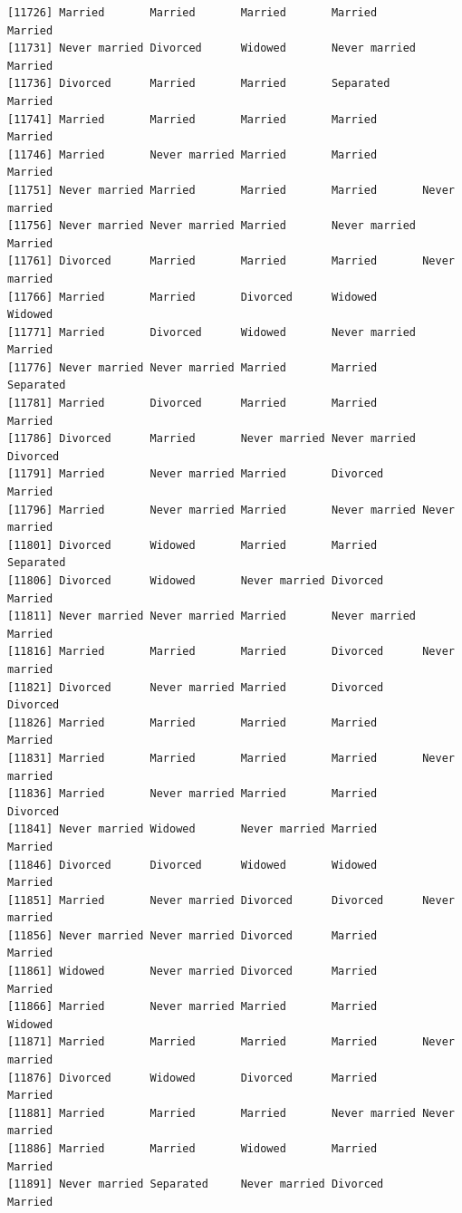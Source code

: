 \documentclass[
  letterpaper,
  DIV=11,
  numbers=noendperiod,
  oneside]{scrartcl}
\begin{document}
\begin{verbatim}
[11726] Married       Married       Married       Married       Married      
[11731] Never married Divorced      Widowed       Never married Married      
[11736] Divorced      Married       Married       Separated     Married      
[11741] Married       Married       Married       Married       Married      
[11746] Married       Never married Married       Married       Married      
[11751] Never married Married       Married       Married       Never married
[11756] Never married Never married Married       Never married Married      
[11761] Divorced      Married       Married       Married       Never married
[11766] Married       Married       Divorced      Widowed       Widowed      
[11771] Married       Divorced      Widowed       Never married Married      
[11776] Never married Never married Married       Married       Separated    
[11781] Married       Divorced      Married       Married       Married      
[11786] Divorced      Married       Never married Never married Divorced     
[11791] Married       Never married Married       Divorced      Married      
[11796] Married       Never married Married       Never married Never married
[11801] Divorced      Widowed       Married       Married       Separated    
[11806] Divorced      Widowed       Never married Divorced      Married      
[11811] Never married Never married Married       Never married Married      
[11816] Married       Married       Married       Divorced      Never married
[11821] Divorced      Never married Married       Divorced      Divorced     
[11826] Married       Married       Married       Married       Married      
[11831] Married       Married       Married       Married       Never married
[11836] Married       Never married Married       Married       Divorced     
[11841] Never married Widowed       Never married Married       Married      
[11846] Divorced      Divorced      Widowed       Widowed       Married      
[11851] Married       Never married Divorced      Divorced      Never married
[11856] Never married Never married Divorced      Married       Married      
[11861] Widowed       Never married Divorced      Married       Married      
[11866] Married       Never married Married       Married       Widowed      
[11871] Married       Married       Married       Married       Never married
[11876] Divorced      Widowed       Divorced      Married       Married      
[11881] Married       Married       Married       Never married Never married
[11886] Married       Married       Widowed       Married       Married      
[11891] Never married Separated     Never married Divorced      Married      

\end{verbatim}
\end{document}
